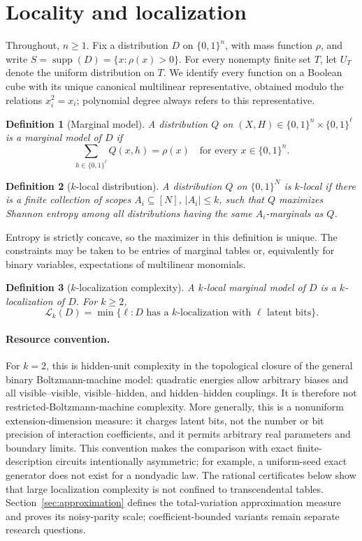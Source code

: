 \documentclass{article}
\newcommand{\LC}{\mathcal{L}}
\newcommand{\supp}{\operatorname{supp}}
\newcommand{\bits}{\{0,1\}}
\newtheorem{definition}{Definition}
\begin{document}
\section{Locality and localization}\label{sec:locality}

Throughout, $n\ge1$.  Fix a distribution $D$ on $\bits^n$, with mass function
$\rho$, and write $S=\supp(D)=\{x:\rho(x)>0\}$.  For every nonempty finite set
$T$, let $U_T$ denote the uniform distribution on $T$.  We identify every
function on a Boolean cube with its unique canonical multilinear
representative, obtained modulo the relations $x_i^2=x_i$; polynomial degree
always refers to this representative.

\begin{definition}[Marginal model]
A distribution $Q$ on $(X,H)\in\bits^n\times\bits^\ell$ is a marginal model of
$D$ if
\[
  \sum_{h\in\bits^\ell}Q(x,h)=\rho(x)
  \quad\text{for every }x\in\bits^n.
\]
\end{definition}

\begin{definition}[$k$-local distribution]
A distribution $Q$ on $\bits^N$ is $k$-local if there is a finite collection of
scopes $A_i\subseteq[N]$, $|A_i|\le k$, such that $Q$ maximizes Shannon entropy
among all distributions having the same $A_i$-marginals as $Q$.
\end{definition}

Entropy is strictly concave, so the maximizer in this definition is unique.
The constraints may be taken to be entries of marginal tables or,
equivalently for binary variables, expectations of multilinear monomials.

\begin{definition}[$k$-localization complexity]
A $k$-local marginal model of $D$ is a $k$-localization of $D$.  For $k\ge2$,
\[
  \LC_k(D)=\min\{\ell:D\text{ has a $k$-localization with $\ell$ latent bits}\}.
\]
\end{definition}

\paragraph{Resource convention.}
For $k=2$, this is hidden-unit complexity in the topological closure of the
general binary Boltzmann-machine model: quadratic energies allow arbitrary
biases and all visible--visible, visible--hidden, and hidden--hidden couplings.
It is therefore not restricted-Boltzmann-machine complexity.  More generally,
this is a nonuniform extension-dimension measure: it charges latent bits, not
the number or bit precision of interaction coefficients, and it permits
arbitrary real parameters and boundary limits.  This convention makes the
comparison with exact finite-description circuits intentionally asymmetric;
for example, a uniform-seed exact generator does not exist for a nondyadic
law.  The rational certificates below show that large localization complexity
is not confined to transcendental tables.  Section~\ref{sec:approximation}
defines the total-variation approximation measure and proves its noisy-parity
scale; coefficient-bounded variants remain separate research questions.
\end{document}
